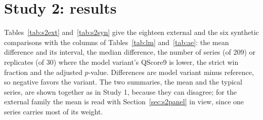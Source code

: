 \providecommand{\lm}{\texttt{local\_mean\_28}}
\providecommand{\qs}{QScore9}
\providecommand{\hc}{\texttt{hurdle\_count\_28}}
\providecommand{\tbd}{\textit{tbd}}
\providecommand{\dir}[1]{\textit{tbd: #1}}

\section{Study 2: results}
\label{sec:s2results}

Tables~\ref{tab:s2ext} and~\ref{tab:s2syn} give the eighteen external and the six synthetic comparisons
with the columns of Tables~\ref{tab:lm} and~\ref{tab:ae}: the mean difference and its interval, the median
difference, the number of series (of 209) or replicates (of 30) where the model variant's \qs{} is lower,
the strict win fraction and the adjusted $p$-value. Differences are model variant minus reference, so
negative favors the variant. The two summaries, the mean and the typical series, are shown together as in
Study 1, because they can disagree; for the external family the mean is read with Section~\ref{sec:s2panel}
in view, since one series carries most of its weight.

